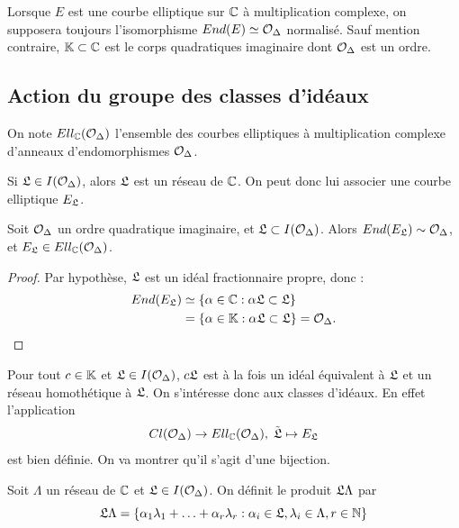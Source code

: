\begin{Rem}
	Lorsque $E$ est une courbe elliptique sur $\mathbb{C}$ à multiplication complexe, on supposera toujours l'isomorphisme $End(E)\simeq\mathcal{O}_{\Delta}$ normalisé. Sauf mention contraire, $\mathbb{K}\subset\mathbb{C}$ est le corps quadratiques imaginaire dont $\mathcal{O}_{\Delta}$ est un ordre.
\end{Rem}



\subsection{Action du groupe des classes d'idéaux}\label{SECTION action}


\begin{Def}
	On note $Ell_{\mathbb{C}}(\mathcal{O}_{\Delta})$ l'ensemble des courbes elliptiques à multiplication complexe d'anneaux d'endomorphismes $\mathcal{O}_{\Delta}$. 
\end{Def}

Si $\mathfrak{L}\in I(\mathcal{O}_{\Delta})$, alors $\mathfrak{L}$ est un réseau de $\mathbb{C}$. On peut donc lui associer une courbe elliptique $E_{\mathfrak{L}}$.

\begin{Prop}
	Soit $\mathcal{O}_{\Delta}$ un ordre quadratique imaginaire, et $\mathfrak{L}\subset I(\mathcal{O}_{\Delta})$. Alors $End(E_{\mathfrak{L}})\sim\mathcal{O}_{\Delta}$, et $E_{\mathfrak{L}}\in Ell_{\mathbb{C}}(\mathcal{O}_{\Delta})$.
\end{Prop}

\begin{proof}
	
	Par hypothèse, $\mathfrak{L}$ est un idéal fractionnaire propre, donc :
	\begin{align*}
		End(E_{\mathfrak{L}})&\simeq\left\lbrace\alpha\in\mathbb{C} : \alpha\mathfrak{L}\subset\mathfrak{L}\right\rbrace\\
		&= \left\lbrace\alpha\in\mathbb{K} : \alpha\mathfrak{L}\subset\mathfrak{L}\right\rbrace = \mathcal{O}_{\Delta}.
	\end{align*}
\end{proof}

Pour tout $c\in\mathbb{K}$ et $\mathfrak{L}\in I(\mathcal{O}_{\Delta})$, $c\mathfrak{L}$ est à la fois un idéal équivalent à $\mathfrak{L}$ et un réseau homothétique à $\mathfrak{L}$. On s'intéresse donc aux classes d'idéaux. En effet l'application
\begin{equation*}
	Cl(\mathcal{O}_{\Delta})\rightarrow Ell_{\mathbb{C}}(\mathcal{O}_{\Delta}),\; \tilde{\mathfrak{L}}\mapsto E_{\mathfrak{L}}
\end{equation*} 
est bien définie. On va montrer qu'il s'agit d'une bijection.

\begin{Def}
	Soit $\Lambda$ un réseau de $\mathbb{C}$ et $\mathfrak{L}\in I(\mathcal{O}_{\Delta})$. On définit le produit $\mathfrak{L}\Lambda$ par
	\begin{equation*}
		\mathfrak{L}\Lambda = \left\lbrace \alpha_1\lambda_1 + \ldots + \alpha_r\lambda_r : \alpha_i\in\mathfrak{L} , \lambda_i\in\Lambda , r\in\mathbb{N}\right\rbrace 
	\end{equation*}
\end{Def}

